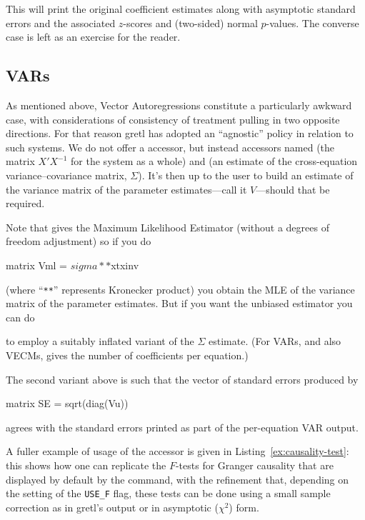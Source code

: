 This will print the original coefficient estimates along with
asymptotic standard errors and the associated
$z$-scores and (two-sided) normal $p$-values. The converse case is
left as an exercise for the reader.

\subsection{VARs}

As mentioned above, Vector Autoregressions constitute a particularly
awkward case, with considerations of consistency of treatment pulling
in two opposite directions. For that reason gretl has adopted an
``agnostic'' policy in relation to such systems. We do not offer a
 accessor, but instead accessors named 
(the matrix $X'X^{-1}$ for the system as a whole) and 
(an estimate of the cross-equation variance--covariance matrix,
$\Sigma$). It's then up to the user to build an estimate of the
variance matrix of the parameter estimates---call it $V$---should that
be required.

Note that  gives the Maximum Likelihood Estimator
(without a degrees of freedom adjustment) so if you do
%
\begin{code}
matrix Vml = $sigma ** $xtxinv
\end{code}
%
(where ``\texttt{**}'' represents Kronecker product) you obtain the
MLE of the variance matrix of the parameter estimates. But if you want
the unbiased estimator you can do
%
%
to employ a suitably inflated variant of the
$\Sigma$ estimate. (For VARs, and also VECMs,  gives
the number of coefficients per equation.)

The second variant above is such that the vector of standard errors
produced by
%
\begin{code}
matrix SE = sqrt(diag(Vu))
\end{code}
%
agrees with the standard errors printed as part of the per-equation
VAR output.

A fuller example of usage of the  accessor is given in
Listing~\ref{ex:causality-test}: this shows how one can replicate the $F$-tests
for Granger causality that are displayed by default by the 
command, with the refinement that, depending on the setting of the
\verb|USE_F| flag, these tests can be done using a small sample
correction as in gretl's output or in asymptotic ($\chi^2$) form.

